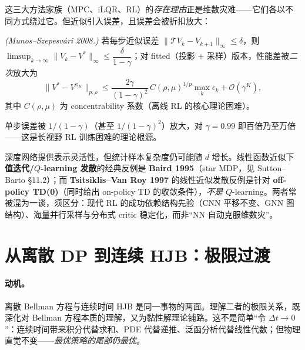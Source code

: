 这三大方法家族（MPC、iLQR、RL）的\emph{存在理由}正是维数灾难——它们各以不同方式绕过它。但近似引入误差，且误差会被折扣放大：

\begin{theorem}[近似 DP 误差放大]\label{thm:dp-adp-error}
\emph{(Munos--Szepesvári 2008\cite{munos2008finite}.)} 若每步近似误差 $\|\mathcal TV_k-V_{k+1}\|_\infty\le\delta$，则 $\limsup_{k\to\infty}\|V_k-V^*\|_\infty\le\dfrac{\delta}{1-\gamma}$；对 fitted（投影 + 采样）版本，性能差被\emph{二次}放大为
\begin{equation}
  \|V^*-V^{\pi_K}\|_{p,\rho}\le\frac{2\gamma}{(1-\gamma)^2}\,C(\rho,\mu)^{1/p}\max_k\epsilon_k+\mathcal O(\gamma^K),
  \label{eq:dp-fvi-bound}
\end{equation}
其中 $C(\rho,\mu)$ 为 concentrability 系数（离线 RL 的核心理论困难）。
\end{theorem}

单步误差被 $1/(1-\gamma)$（甚至 $1/(1-\gamma)^2$）放大，对 $\gamma=0.99$ 即百倍乃至万倍——这是长视野 RL 训练困难的理论根源。

\begin{tcolorbox}[colback=red!4,colframe=red!55!black,title=陷阱专栏：“神经网络自动解维数灾”是误解（E1 勘误）]
深度网络提供表示灵活性，但统计样本复杂度仍可能随 $d$ 增长。线性函数近似下\textbf{值迭代/$Q$-learning 发散}的经典反例是 \textbf{Baird 1995}（star MDP，见 Sutton--Barto §11.2\cite{sutton2018rl}）；而 \textbf{Tsitsiklis--Van Roy 1997}\cite{tsitsiklis1997td} 的线性近似发散反例是针对 \textbf{off-policy TD(0)}（同时给出 on-policy TD 的收敛条件），\emph{不是} $Q$-learning。两者常被混为一谈，须区分：现代 RL 的成功依赖结构先验（CNN 平移不变、GNN 图结构）、海量并行采样与分布式 critic 稳定化，而非“NN 自动克服维数灾”。
\end{tcolorbox}

\section{从离散 DP 到连续 HJB：极限过渡}
\label{sec:dp-limit}

\paragraph{动机。}
离散 Bellman 方程与连续时间 HJB 是同一事物的两面。理解二者的极限关系，既深化对 Bellman 方程本质的理解，又为黏性解理论铺路。这不是简单“令 $\Delta t\to0$”：连续时间带来积分代替求和、PDE 代替递推、泛函分析代替线性代数；但物理直觉不变——\emph{最优策略的尾部仍最优}。

